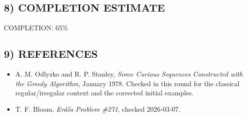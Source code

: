 \subsection*{8) COMPLETION ESTIMATE}
COMPLETION: 65\%

\subsection*{9) REFERENCES}
\begin{itemize}
\item A. M. Odlyzko and R. P. Stanley, \emph{Some Curious Sequences Constructed with the Greedy Algorithm}, January 1978. Checked in this round for the classical regular/irregular context and the corrected initial examples.
\item T. F. Bloom, \emph{Erd\H{o}s Problem \#271}, checked 2026-03-07.
\end{itemize}

